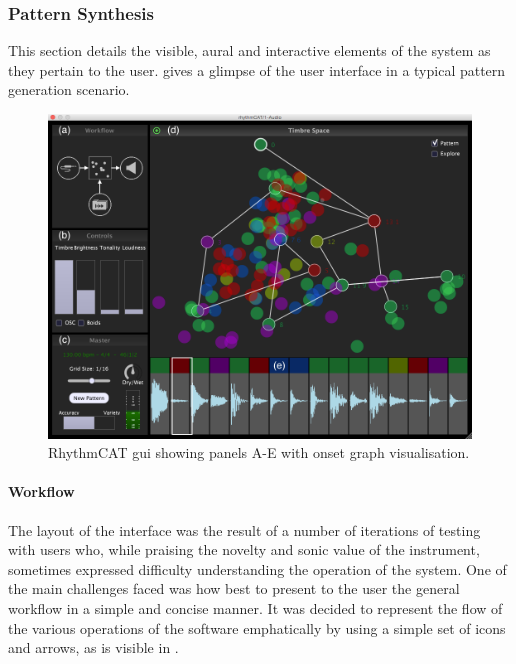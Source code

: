\subsubsection{Pattern Synthesis}

This section details the visible, aural and interactive elements of the system as they pertain to the user.  gives a glimpse of the user interface in a typical pattern generation scenario.

\begin{figure}
	\begin{center}
		\includegraphics[scale=0.45]{ch06_rhythmcat/figures/rhythmcat.png}		
		\end{center}
		\caption[RhythmCAT user interface]{RhythmCAT \acrshort{gui} showing panels A-E with onset graph visualisation.}
	\label{fig:rhythmcat_interface}
\end{figure}

\paragraph{Workflow}

The layout of the interface was the result of a number of iterations of testing with users who, while praising the novelty and sonic value of the instrument, sometimes expressed difficulty understanding the operation of the system. One of the main challenges faced was how best to present to the user the general workflow in a simple and concise manner. It was decided to represent the flow of the various operations of the software emphatically by using a simple set of icons and arrows, as is visible in .

